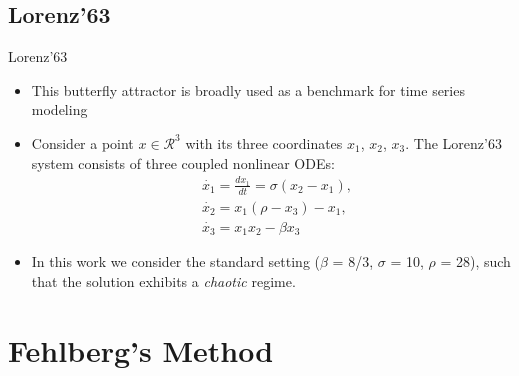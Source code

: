\documentclass{EESD}
\begin{document}
\subsection{Lorenz’63}
\begin{frame}[t]{Lorenz’63}
\begin{itemize}
    \item This butterfly attractor is broadly used as a benchmark for time series modeling\pause
    \item Consider a point $x\in \mathcal{R}^3$ with its three coordinates $x_1$, $x_2$, $x_3$. The Lorenz’63 system consists of three coupled nonlinear ODEs:
    \begin{equation}
    \begin{aligned}
        &\dot{x_1} = \frac{dx_1}{dt} = \sigma(x_2 - x_1), \\ 
        &\dot{x_2} = x_1(\rho - x_3) - x_1, \\
        &\dot{x_3} = x_1 x_2 - \beta x_3
    \end{aligned}
    \end{equation}
    \vspace{10pt}\pause
    \item In this work we consider the standard setting ($\beta$ = 8/3, $\sigma$ = 10, $\rho$ = 28), such that the solution exhibits a \textit{chaotic} regime. \vspace{10pt}
\end{itemize}
\end{frame}


\section{Fehlberg's Method}
\end{document}
